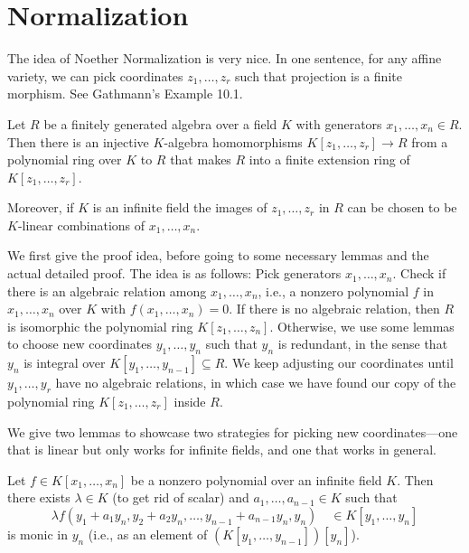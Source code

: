 \documentclass[12pt]{article}
\begin{document}
\section{Normalization}

\begin{rmk}
    The idea of Noether Normalization is very nice. In one sentence, for any affine variety, we can pick coordinates $z_1,\dots,z_r$ such that projection is a finite morphism. See Gathmann's Example 10.1.
\end{rmk}

\begin{prop} \label{noether}
    Let $R$ be a finitely generated algebra over a field $K$ with generators $x_1,\dots,x_n \in R$. Then there is an injective $K$-algebra homomorphisms $K[z_1,\dots,z_r]\to R$ from a polynomial ring over $K$ to $R$ that makes $R$ into a finite extension ring of $K[z_1,\dots,z_r]$.
    
    Moreover, if $K$ is an infinite field the images of $z_1,\dots,z_r$ in $R$ can be chosen to be $K$-linear combinations of $x_1, \dots, x_n$.
\end{prop}

We first give the proof idea, before going to some necessary lemmas and the actual detailed proof. The idea is as follows: Pick generators $x_1,\dots,x_n$. Check if there is an algebraic relation among $x_1,\dots,x_n$, i.e., a nonzero polynomial $f$ in $x_1,\dots,x_n$ over $K$ with $f(x_1,\dots,x_n)=0$. If there is no algebraic relation, then $R$ is isomorphic the polynomial ring $K[z_1,\dots,z_n]$. Otherwise, we use some lemmas to choose new coordinates $y_1,\dots,y_n$ such that $y_n$ is redundant, in the sense that $y_n$ is integral over $K[y_1,\dots,y_{n-1}]\subseteq R$. We keep adjusting our coordinates until $y_1,\dots,y_r$ have no algebraic relations, in which case we have found our copy of the polynomial ring $K[z_1,\dots,z_r]$ inside $R$.

We give two lemmas to showcase two strategies for picking new coordinates---one that is linear but only works for infinite fields, and one that works in general.

\begin{lem} \label{newcoordsinf}
    Let $f\in K[x_1,\dots,x_n]$ be a nonzero polynomial over an infinite field $K$. Then there exists $\lambda\in K$ (to get rid of scalar) and $a_1,\dots,a_{n-1}\in K$ such that
    \[\lambda f(y_1+a_1 y_n, y_2 + a_2 y_n, \dots, y_{n-1} + a_{n-1}y_n, y_n) \quad \in K[y_1,\dots,y_n]\]
    is monic in $y_n$ (i.e., as an element of $(K[y_1,\dots,y_{n-1}])[y_n]$).
\end{lem}
\end{document}

